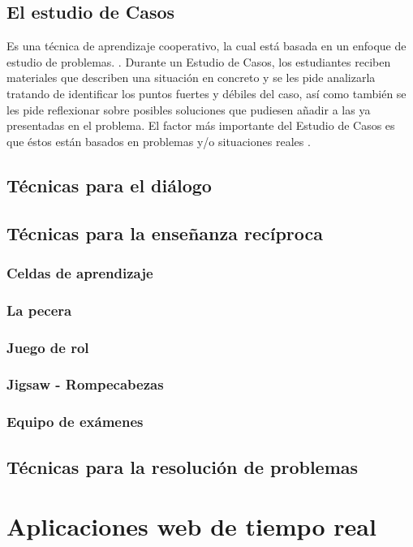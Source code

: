 \subsection{El estudio de Casos}
Es una técnica de aprendizaje cooperativo, la cual está basada en un enfoque de estudio de problemas. \cite{JCAL:JCAL119}. Durante un Estudio de Casos, los estudiantes reciben materiales que describen una situación en concreto y se les pide analizarla tratando de identificar los puntos fuertes y débiles del caso, así como también se les pide reflexionar sobre posibles soluciones que pudiesen añadir a las ya presentadas en el problema. El factor más importante del Estudio de Casos es que éstos están basados en problemas y/o situaciones reales \cite{JCAL:JCAL119}.


\subsection{Técnicas para el diálogo}
\subsection{Técnicas para la enseñanza recíproca}
\subsubsection{Celdas de aprendizaje}
\subsubsection{La pecera}
\subsubsection{Juego de rol}
\subsubsection{Jigsaw - Rompecabezas}
\subsubsection{Equipo de exámenes}
\subsection{Técnicas para la resolución de problemas}

\section{Aplicaciones web de tiempo real}
